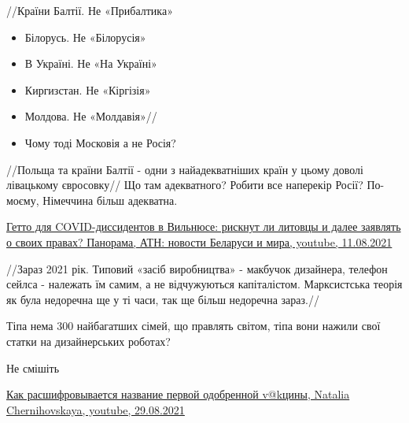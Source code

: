 \begin{itemize}
\begin{itemize}
//Країни Балтії. Не «Прибалтика»

\begin{itemize}
  \item Білорусь. Не «Білорусія»
  \item В Україні. Не «На Україні»
  \item Киргизстан. Не «Кіргізія»
  \item Молдова. Не «Молдавія»//
  \item Чому тоді Московія а не Росія?
\end{itemize}

 
//Польща та країни Балтії - одни з найадекватніших країн у цьому доволі лівацькому євросовку//
Що там адекватного?
Робити все наперекір Росії?
По-моєму, Німеччина більш адекватна.

\href{https://youtu.be/VXxHrAbPPUY}{%
Гетто для COVID-диссидентов в Вильнюсе: рискнут ли литовцы и далее заявлять о своих правах? Панорама, %
АТН: новости Беларуси и мира, youtube, 11.08.2021%
}

 
//Зараз 2021 рік. Типовий «засіб виробництва» - макбучок дизайнера, телефон
сейлса - належать їм самим, а не відчужуються капіталістом. Марксистська теорія
як була недоречна ще у ті часи, так ще більш недоречна зараз.//

Тіпа нема 300 найбагатших сімей, що правлять світом, тіпа вони нажили свої статки на дизайнерських роботах?

Не смішіть

\href{https://youtu.be/Q8bncksDUAE}{%
Как расшифровывается название первой одобренной v@kцины, %
Natalia Chernihovskaya, youtube, %
29.08.2021%
}

 


\end{itemize}
\end{itemize}
